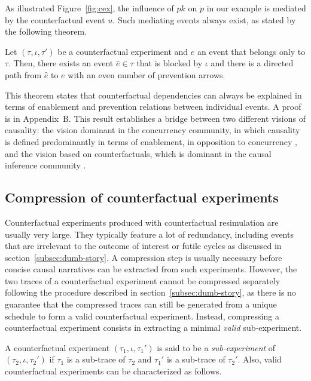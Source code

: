 As illustrated Figure~\ref{fig:cex}, the influence of $pk$ on $p$ in
our example is mediated by the counterfactual event $u$. Such
mediating events always exist, as stated by the following theorem.

\begin{theorem}
  \label{thm:completeness}
  Let $(\tau, \iota, \tau')$ be a counterfactual experiment and $e$ an
  event that belongs only to $\tau$. Then, there exists an event
  $\hat e \in \tau$ that is blocked by $\iota$ and there is a directed
  path from $\hat e$ to $e$ with an even number of prevention arrows.
\end{theorem}
\noindent This theorem states that counterfactual dependencies can always be
explained in terms of enablement and prevention relations between individual
events. A proof is in Appendix~B.
This result establishes a
bridge between two different visions of causality: the vision dominant in the
concurrency community, in which causality is defined predominantly in terms of
enablement, in opposition to concurrency  \cite{winskel1986event}, and the
vision based on counterfactuals, which is dominant in the causal inference
community \cite{pearl2009causality}.

\subsection{Compression of counterfactual experiments}

Counterfactual experiments produced with counterfactual resimulation
are usually very large. They typically feature a lot of redundancy,
including events that are irrelevant to the outcome of interest or
futile cycles as discussed in section~\ref{subsec:dumb-story}. A
compression step is usually necessary before concise causal narratives
can be extracted from such experiments. However, the two traces of a
counterfactual experiment cannot be compressed separately following
the procedure described in section~\ref{subsec:dumb-story}, as there
is no guarantee that the compressed traces can still be generated from
a unique schedule to form a valid counterfactual experiment. Instead,
compressing a counterfactual experiment consists in extracting a
minimal \emph{valid} sub-experiment.

A counterfactual experiment $(\tau_1, \iota, \tau_1')$ is said to be a
\emph{sub-experiment} of $(\tau_2, \iota, \tau_2')$ if $\tau_1$ is a
sub-trace of $\tau_2$ and $\tau_1'$ is a sub-trace of $\tau_2'$. Also,
valid counterfactual experiments can be characterized as follows.

